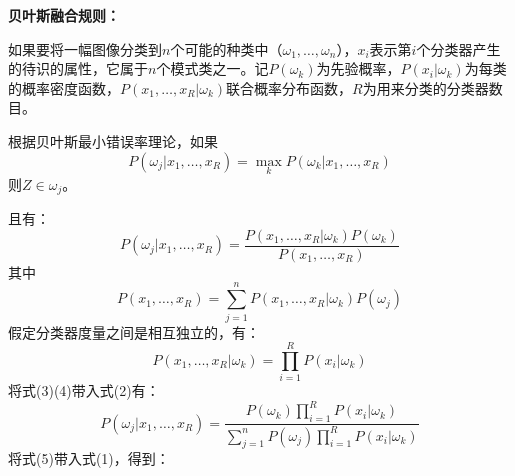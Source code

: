 \textbf{贝叶斯融合规则：}

如果要将一幅图像分类到$n$个可能的种类中（$\omega_{1},\dots,\omega_{n}$），$x_{i}$表示第$i$个分类器产生的待识的属性，它属于$n$个模式类之一。记$P(\omega_{k})$为先验概率，$P(x_{i}|\omega_{k})$为每类的概率密度函数，$P(x_{1},\dots,x_{R}|\omega_{k})$联合概率分布函数，$R$为用来分类的分类器数目。

根据贝叶斯最小错误率理论，如果
\begin{equation}
P(\omega_{j}|x_{1},\dots,x_{R})=\max_{k}P(\omega_{k}|x_{1},\dots,x_{R})
\end{equation}
则$Z\in\omega_{j}$。

且有：
\begin{equation}
P(\omega_{j}|x_{1},\dots,x_{R})=\frac{P(x_{1},\dots,x_{R}|\omega_{k})P(\omega_{k})}{P(x_{1},\dots,x_{R})}
\end{equation}
其中
\begin{equation}
P(x_{1},\dots,x_{R})=\sum^{n}_{j=1}P(x_{1},\dots,x_{R}|\omega_{k})P(\omega_{j})
\end{equation}
假定分类器度量之间是相互独立的，有：
\begin{equation}
P(x_{1},\dots,x_{R}|\omega_{k})=\prod^{R}_{i=1}P(x_{i}|\omega_{k})
\end{equation}
将式(3)(4)带入式(2)有：
\begin{equation}
P(\omega_{j}|x_{1},\dots,x_{R})=\frac{P(\omega_{k})\prod^{R}_{i=1}P(x_{i}|\omega_{k})}{\sum^{n}_{j=1}P(\omega_{j})\prod^{R}_{i=1}P(x_{i}|\omega_{k})}
\end{equation}
将式(5)带入式(1)，得到：
